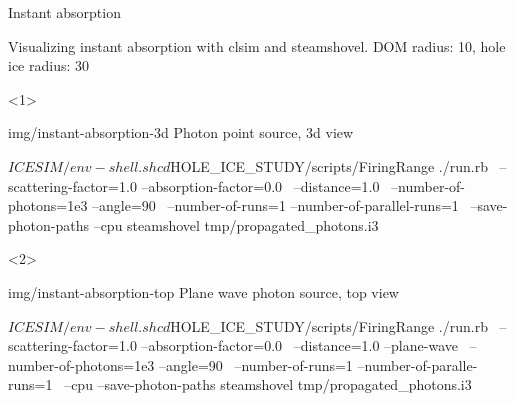 
\begin{frame}[fragile]{Instant absorption}

  Visualizing instant absorption with clsim and steamshovel.
  \small{DOM radius: 10\cm, hole ice radius: 30\cm}

  \begin{onlyenv}<1>
    \begin{sideimage}{img/instant-absorption-3d}
      Photon point source, 3d view

      \begin{bash}
        $ICESIM/env-shell.sh
        cd $HOLE_ICE_STUDY/scripts/FiringRange
        ./run.rb \
            --scattering-factor=1.0 --absorption-factor=0.0 \
            --distance=1.0 \
            --number-of-photons=1e3 --angle=90 \
            --number-of-runs=1 --number-of-parallel-runs=1 \
            --save-photon-paths --cpu
        steamshovel tmp/propagated_photons.i3
      \end{bash}
    \end{sideimage}
  \end{onlyenv}

  \begin{onlyenv}<2>
    \begin{sideimage}{img/instant-absorption-top}
      Plane wave photon source, top view

      \begin{bash}
        $ICESIM/env-shell.sh
        cd $HOLE_ICE_STUDY/scripts/FiringRange
        ./run.rb \
            --scattering-factor=1.0 --absorption-factor=0.0 \
            --distance=1.0 --plane-wave \
            --number-of-photons=1e3 --angle=90 \
            --number-of-runs=1 --number-of-paralle-runs=1 \
            --cpu --save-photon-paths
        steamshovel tmp/propagated_photons.i3
      \end{bash}
    \end{sideimage}
  \end{onlyenv}

\end{frame}

